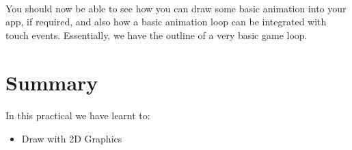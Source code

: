 \paragraph{} You should now be able to see how you can draw some basic animation into your app, if required, and also how a basic animation loop can be integrated with touch events. Essentially, we have the outline of a very basic game loop.

\section{Summary}
\paragraph{} In this practical we have learnt to:

\begin{itemize}
\item Draw with 2D Graphics
\end{itemize}


